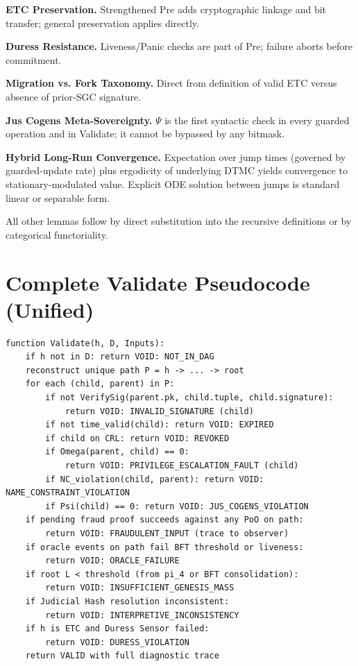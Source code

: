 \documentclass[11pt,a4paper]{article}
\begin{document}
\begin{appendix}
\textbf{ETC Preservation.} Strengthened Pre adds cryptographic linkage and bit transfer; general preservation applies directly.

\textbf{Duress Resistance.} Liveness/Panic checks are part of Pre; failure aborts before commitment.

\textbf{Migration vs. Fork Taxonomy.} Direct from definition of valid ETC versus absence of prior-SGC signature.

\textbf{Jus Cogens Meta-Sovereignty.} \(\Psi\) is the first syntactic check in every guarded operation and in Validate; it cannot be bypassed by any bitmask.

\textbf{Hybrid Long-Run Convergence.} Expectation over jump times (governed by guarded-update rate) plus ergodicity of underlying DTMC yields convergence to stationary-modulated value. Explicit ODE solution between jumps is standard linear or separable form.

All other lemmas follow by direct substitution into the recursive definitions or by categorical functoriality.

\section{Complete Validate Pseudocode (Unified)}

\begin{verbatim}
function Validate(h, D, Inputs):
    if h not in D: return VOID: NOT_IN_DAG
    reconstruct unique path P = h -> ... -> root
    for each (child, parent) in P:
        if not VerifySig(parent.pk, child.tuple, child.signature):
            return VOID: INVALID_SIGNATURE (child)
        if not time_valid(child): return VOID: EXPIRED
        if child on CRL: return VOID: REVOKED
        if Omega(parent, child) == 0:
            return VOID: PRIVILEGE_ESCALATION_FAULT (child)
        if NC_violation(child, parent): return VOID: NAME_CONSTRAINT_VIOLATION
        if Psi(child) == 0: return VOID: JUS_COGENS_VIOLATION
    if pending fraud proof succeeds against any PoO on path:
        return VOID: FRAUDULENT_INPUT (trace to observer)
    if oracle events on path fail BFT threshold or liveness:
        return VOID: ORACLE_FAILURE
    if root L < threshold (from pi_4 or BFT consolidation):
        return VOID: INSUFFICIENT_GENESIS_MASS
    if Judicial Hash resolution inconsistent:
        return VOID: INTERPRETIVE_INCONSISTENCY
    if h is ETC and Duress Sensor failed:
        return VOID: DURESS_VIOLATION
    return VALID with full diagnostic trace
\end{verbatim}


\end{appendix}
\end{document}
